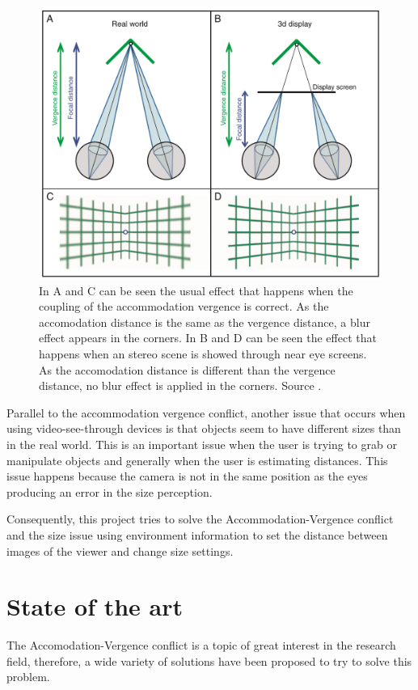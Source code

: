\documentclass[10pt,a4paper,twocolumn,twoside]{article}
\begin{document}
	\begin{figure}
		\centering
		\includegraphics[width=1\linewidth]{img/vergencia.png}
		\caption{ In A and C can be seen the usual effect that happens when the coupling of the accommodation vergence is correct. As the accomodation distance is the same as the vergence distance, a blur effect appears in the corners. In B and D can be seen the effect that happens when an stereo scene is showed through near eye screens. As the accomodation distance is different than the vergence distance, no blur effect is applied in the corners. Source \cite{vergenceDisconfort}.}
		\label{fig:vergence}
	\end{figure}
	
	Parallel to the accommodation vergence conflict, another issue that occurs when using video-see-through devices is that objects seem to have different sizes than in the real world. This is an important issue when the user is trying to grab or manipulate objects and generally when the user is estimating distances. This issue happens because the camera is not in the same position as the eyes producing an error in the size perception.
	
	Consequently, this project tries to solve the Accommodation-Vergence conflict and the size issue using environment information to set the distance between images of the viewer and change size settings.
	
		
	\section{State of the art}
	\label{sec:art}
	The Accomodation-Vergence conflict is a topic of great interest in the research field, therefore, a wide variety of  solutions have been proposed to try to solve this problem. 
	
\end{document}
